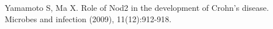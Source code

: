 \documentclass{ws-procs11x85}
\begin{document}
\begin{thebibliography}{10}
 Yamamoto S, Ma X. Role of Nod2 in the development of Crohn's disease. Microbes and infection (2009), 11(12):912-918.






\end{thebibliography}
\end{document}
